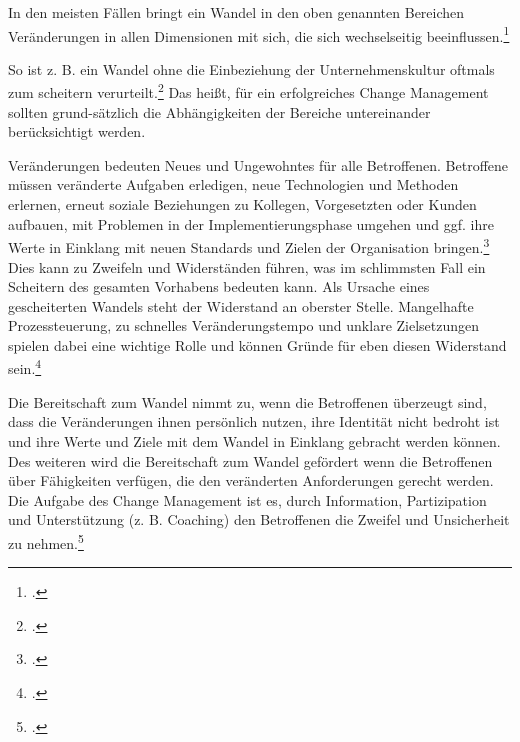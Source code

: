 In den meisten Fällen bringt ein Wandel in den oben genannten Bereichen Veränderungen in allen Dimensionen mit sich, die sich wechselseitig beeinflussen.\footcite[Vgl.][]{sonntag_change_2008} 

So ist z. B. ein Wandel ohne die Einbeziehung der Unternehmenskultur oftmals zum scheitern verurteilt.\footcite[Vgl.][]{lauer_change_2014} Das heißt, für ein erfolgreiches Change Management sollten grund-sätzlich die Abhängigkeiten der Bereiche untereinander berücksichtigt werden.

Veränderungen bedeuten Neues und Ungewohntes für alle Betroffenen. 
Betroffene müssen veränderte Aufgaben erledigen, neue Technologien und Methoden erlernen, erneut soziale Beziehungen zu Kollegen, Vorgesetzten oder Kunden aufbauen, mit Problemen in der Implementierungsphase umgehen und ggf. ihre Werte in Einklang mit neuen Standards und Zielen der Organisation bringen.\footcite[Vgl.][]{sonntag_change_2008} Dies kann zu Zweifeln und Widerständen führen, was im schlimmsten Fall ein Scheitern des gesamten Vorhabens bedeuten kann. Als Ursache eines gescheiterten Wandels steht der Widerstand an oberster Stelle. Mangelhafte Prozessteuerung, zu schnelles Veränderungstempo und unklare Zielsetzungen spielen dabei eine wichtige Rolle und können Gründe für eben diesen Widerstand sein.\footcite[Vgl.][]{lauer_change_2014}

Die Bereitschaft zum Wandel nimmt zu, wenn die Betroffenen überzeugt sind, dass die Veränderungen ihnen persönlich nutzen, ihre Identität nicht bedroht ist und ihre Werte und Ziele mit dem Wandel in Einklang gebracht werden können. Des weiteren wird die Bereitschaft zum Wandel gefördert wenn die Betroffenen über Fähigkeiten verfügen, die den veränderten Anforderungen gerecht werden. Die Aufgabe des Change Management ist es, durch Information, Partizipation und Unterstützung (z. B. Coaching) den Betroffenen die Zweifel und Unsicherheit zu nehmen.\footcite[Vgl.][]{sonntag_change_2008}

